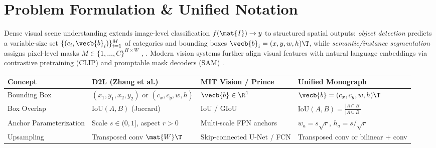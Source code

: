 \documentclass[../../../../master.tex]{subfiles}
\begin{document}

\section{Problem Formulation \& Unified Notation}

\begin{sloppypar}
Dense visual scene understanding extends image-level classification $f(\mat{I}) \to y$ to structured spatial outputs: \emph{object detection} predicts a variable-size set $\{(c_i, \vecb{b}_i)\}_{i=1}^M$ of categories and bounding boxes $\vecb{b}_i = (x, y, w, h)\T$, while \emph{semantic/instance segmentation} assigns pixel-level masks $M \in \{1,\dots,C\}^{H \times W}$ , . Modern vision systems further align visual features with natural language embeddings via contrastive pretraining (CLIP) and promptable mask decoders (SAM) .
\end{sloppypar}

\begin{crossbook}
\begin{center}
\footnotesize
\begin{tabularx}{\linewidth}{@{} >{\raggedright\arraybackslash}p{2.6cm} >{\raggedright\arraybackslash}X >{\raggedright\arraybackslash}X >{\raggedright\arraybackslash}X @{}}
\toprule
\textbf{Concept} & \textbf{D2L (Zhang et al.)} & \textbf{MIT Vision / Prince} & \textbf{Unified Monograph} \\
\midrule
Bounding Box & $(x_1,y_1,x_2,y_2)$ or $(c_x,c_y,w,h)$ & $\vecb{b} \in \R^4$ & $\vecb{b} = (c_x, c_y, w, h)\T$ \\
Box Overlap & $\mathrm{IoU}(A,B)$ (Jaccard) & IoU / GIoU & $\mathrm{IoU}(A,B) = \frac{|A \cap B|}{|A \cup B|}$ \\
Anchor Parameterization & Scale $s \in (0,1]$, aspect $r > 0$ & Multi-scale FPN anchors & $w_a = s\sqrt{r}$, $h_a = s/\sqrt{r}$ \\
Upsampling & Transposed conv $\mat{W}\T$ & Skip-connected U-Net / FCN & Transposed conv or bilinear + conv \\
\bottomrule
\end{tabularx}
\end{center}
\end{crossbook}
\end{document}
